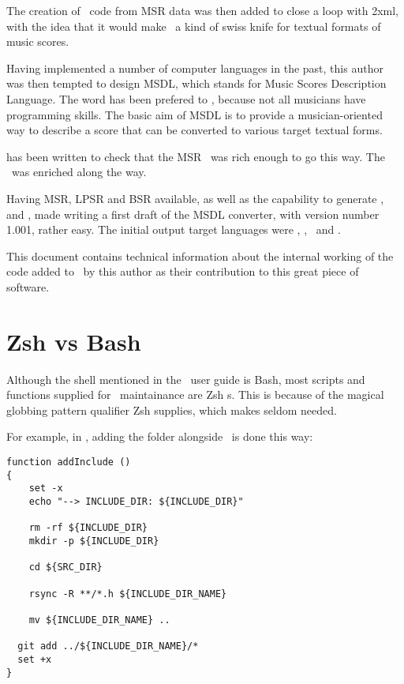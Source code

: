 The creation of \mxml\ code from MSR data was then added to close a loop with \mxml2xml, with the idea that it would make \mf\ a kind of swiss knife for textual formats of music scores.

Having implemented a number of computer languages in the past, this author was then tempted to design MSDL, which stands for Music Scores Description Language. The word  has been prefered to , because not all musicians have programming skills.
The basic aim of MSDL is to provide a musician-oriented way to describe a score that can be converted to various target textual forms.

 has been written to check that the MSR \API\ was rich enough to go this way. The \API\ was enriched along the way.

Having MSR, LPSR and BSR available, as well as the capability to generate \mxml, \lily\, \guido and \braille, made writing a first draft of the MSDL converter, with version number 1.001, rather easy. The initial output target languages were \mxml, \lily, \mxml\ and \braille.

This document contains technical information about the internal working of the code added to \mf\ by this author as their contribution to this great piece of software.


\section{Zsh vs Bash}

Although the shell mentioned in the \mf\ user guide is Bash, most scripts and functions supplied for \mf\ maintainance are Zsh s.
This is because of the magical globbing pattern qualifier \code{**/} Zsh supplies, which makes  seldom needed.

For example, in , adding the  folder alongside \srcFolder\ is done this way:
\begin{lstlisting}[language=Terminal]
function addInclude ()
{
	set -x
	echo "--> INCLUDE_DIR: ${INCLUDE_DIR}"

	rm -rf ${INCLUDE_DIR}
	mkdir -p ${INCLUDE_DIR}

	cd ${SRC_DIR}

	rsync -R **/*.h ${INCLUDE_DIR_NAME}

	mv ${INCLUDE_DIR_NAME} ..

  git add ../${INCLUDE_DIR_NAME}/*
  set +x
}
\end{lstlisting}

